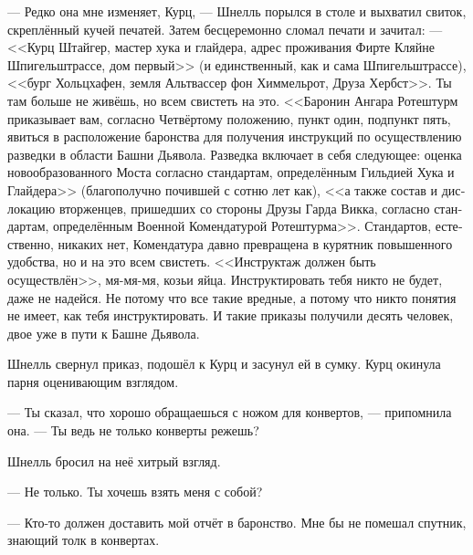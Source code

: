 \documentclass[a4paper,12pt,fleqn]{book}\usepackage{polyglossia}\setdefaultlanguage[babelshorthands=true]{russian}\setotherlanguage{english}\defaultfontfeatures{Ligatures=TeX,Mapping=tex-text}\usepackage{xcolor}\newcommand{\ml}[3]{#2}
\begin{document}
--- Редко она мне изменяет, Курц, --- Шнелль порылся в столе и выхватил свиток, скреплённый кучей печатей.
Затем бесцеремонно сломал печати и зачитал:
\ml{$0$}
{--- <<Курц Штайгер, мастер хука и глайдера, адрес проживания Фирте Кляйне Шпигельштрассе, дом первый>> (и единственный, как и сама Шпигельштрассе), <<бург Хольцхафен, земля Альтвассер фон Химмельрот, Друза Хербст>>.}
{``\textit{Kurz Steiger, hook-n-gleider masterin, Vierte Kleine Spiegelstraße, building one} (and only, as Spiegelstraße itself), \textit{Burg Holzhafen, Shire Altwasser von Himmelrot, Druse Herbst.}}
Ты там больше не живёшь, но всем свистеть на это.
<<Баронин Ангара Ротештурм приказывает вам, согласно Четвёртому положению, пункт один, подпункт пять, явиться в расположение баронства для получения инструкций по осуществлению разведки в области Башни Дьявола.
Разведка включает в себя следующее: оценка новообразованного Моста согласно стандартам, определённым Гильдией Хука и Глайдера>> (благополучно почившей с сотню лет как), <<а также состав и дислокацию вторженцев, пришедших со стороны Друзы Гарда Викка, согласно стандартам, определённым Военной Комендатурой Ротештурма>>.
Стандартов, естественно, никаких нет, Комендатура давно превращена в курятник повышенного удобства, но и на это всем свистеть.
\ml{$0$}
{<<Инструктаж должен быть осуществлён>>, мя-мя-мя, козьи яйца.}
{\textit{The briefing shall be}, mäh-mäh-mäh, goat's bollocks.}
\ml{$0$}
{Инструктировать тебя никто не будет, даже не надейся.}
{No one will brief you, though, no hope.}
\ml{$0$}
{Не потому что все такие вредные, а потому что никто понятия не имеет, как тебя инструктировать.}
{Not because everybody are cunts, but because no one has a clue how to do that.}
И такие приказы получили десять человек, двое уже в пути к Башне Дьявола.

Шнелль свернул приказ, подошёл к Курц и засунул ей в сумку.
Курц окинула парня оценивающим взглядом.

--- Ты сказал, что хорошо обращаешься с ножом для конвертов, --- припомнила она.
\ml{$0$}
{--- Ты ведь не только конверты режешь?}
{``Your knife is good not only for envelopes, isn't it?''}

Шнелль бросил на неё хитрый взгляд.

\ml{$0$}
{--- Не только.}
{``Not only.}
\ml{$0$}
{Ты хочешь взять меня с собой?}
{Do you want me to go with you?''}

--- Кто-то должен доставить мой отчёт в баронство.
\ml{$0$}
{Мне бы не помешал спутник, знающий толк в конвертах.}
{I could use a companion who knows envelopes.''}
\end{document}
